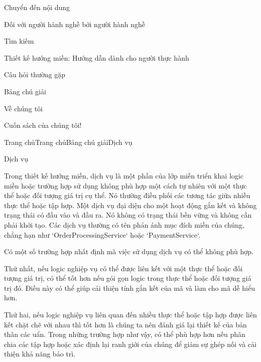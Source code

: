 




Chuyển đến nội dung

Đối với người hành nghề bởi người hành nghề

Tìm kiếm

Thiết kế hướng miền: Hướng dẫn dành cho người thực hành

Câu hỏi thường gặp

Bảng chú giải

Về chúng tôi

Cuốn sách của chúng tôi!

Trang chủTrang chủBảng chú giảiDịch vụ

Dịch vụ

Trong thiết kế hướng miền, dịch vụ là một phần của lớp miền triển khai logic miền hoặc trường hợp sử dụng không phù hợp một cách tự nhiên với một thực thể hoặc đối tượng giá trị cụ thể. Nó thường điều phối các tương tác giữa nhiều thực thể hoặc tập hợp. Một dịch vụ đại diện cho một hoạt động gắn kết và không trạng thái có đầu vào và đầu ra. Nó không có trạng thái bền vững và không cần phải khởi tạo. Các dịch vụ thường có tên phản ánh mục đích miền của chúng, chẳng hạn như `OrderProcessingService` hoặc `PaymentService`.

Có một số trường hợp nhất định mà việc sử dụng dịch vụ có thể không phù hợp.

Thứ nhất, nếu logic nghiệp vụ có thể được liên kết với một thực thể hoặc đối tượng giá trị, có thể tốt hơn nếu gói gọn logic trong thực thể hoặc đối tượng giá trị đó. Điều này có thể giúp cải thiện tính gắn kết của mã và làm cho mã dễ hiểu hơn.

Thứ hai, nếu logic nghiệp vụ liên quan đến nhiều thực thể hoặc tập hợp được liên kết chặt chẽ với nhau thì tốt hơn là chúng ta nên đánh giá lại thiết kế của bản thân các uẩn. Trong những trường hợp như vậy, có thể phù hợp hơn nếu phân chia các tập hợp hoặc xác định lại ranh giới của chúng để giảm sự ghép nối và cải thiện khả năng bảo trì.

